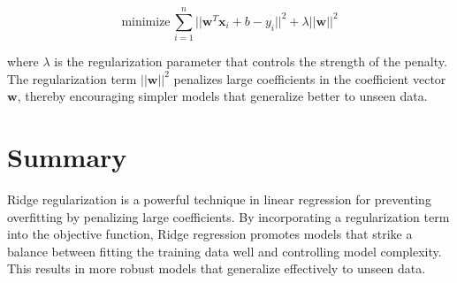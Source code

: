 \documentclass{article}
\begin{document}
\[
\text{minimize} \, \sum_{i=1}^n || \mathbf{w}^T \mathbf{x}_i + b - y_i ||^2 + \lambda || \mathbf{w} ||^2
\]

where $\lambda$ is the regularization parameter that controls the strength of the penalty. The regularization term $|| \mathbf{w} ||^2$ penalizes large coefficients in the coefficient vector $\mathbf{w}$, thereby encouraging simpler models that generalize better to unseen data.

\section*{Summary}

Ridge regularization is a powerful technique in linear regression for preventing overfitting by penalizing large coefficients. By incorporating a regularization term into the objective function, Ridge regression promotes models that strike a balance between fitting the training data well and controlling model complexity. This results in more robust models that generalize effectively to unseen data.
\end{document}
